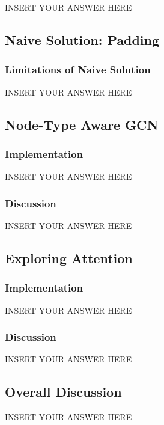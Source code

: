 \documentclass[a4paper,12pt]{article}
\begin{document}
INSERT YOUR ANSWER HERE


\subsection{Naive Solution: Padding}

\subsubsection{Limitations of Naive Solution}

INSERT YOUR ANSWER HERE


\subsection{Node-Type Aware GCN}

\subsubsection{Implementation}

INSERT YOUR ANSWER HERE


\subsubsection{Discussion}

INSERT YOUR ANSWER HERE


\subsection{Exploring Attention}

\subsubsection{Implementation}

INSERT YOUR ANSWER HERE


\subsubsection{Discussion}

INSERT YOUR ANSWER HERE



\subsection{Overall Discussion}

INSERT YOUR ANSWER HERE
\end{document}
